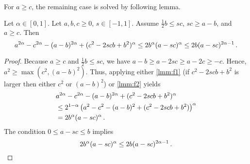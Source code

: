 %
For $a\geq c$, the remaining case is solved by following lemma.
%
\begin{lemma}\label{lmm:rascgeqacandageqc}
	Let $\alpha\in[0,1]$.
	Let $a,b,c\geq0$, $s\in[-1,1]$.
	Assume $\frac12 b \leq sc$, $sc \geq a-b$, and $a\geq c$.
	Then
	\begin{equation*}
		a^{2\alpha}-c^{2\alpha}-(a-b)^{2\alpha}+(c^2 - 2 s c b + b^2)^\alpha 
		\leq 
		2 b^\alpha (a-sc)^{\alpha}
		\leq 
		2 b (a-sc)^{2\alpha-1}
		\, .
	\end{equation*}
\end{lemma}
%
\begin{proof}
	Because $a \geq c$ and $\frac12 b \leq sc$, we have $a-b \geq a-2sc \geq a-2c \geq -c$. Hence, $a^2 \geq \max(c^2, (a-b)^2)$.
	Thus, applying either \autoref{lmm:f1} (if $c^2 - 2 s c b + b^2$ is larger then either $c^2$ or $(a-b)^2$) or \autoref{lmm:f2} yields
	\begin{align*}
		&a^{2\alpha}-c^{2\alpha}-(a-b)^{2\alpha}+(c^2 - 2 s c b + b^2)^\alpha 
		\\&\leq 
		2^{1-\alpha}
		\left( a^{2}-c^{2}-(a-b)^{2}+(c^2 - 2 s c b + b^2) \right)^\alpha 
		\\&=
		2 b^\alpha (a-sc)^{\alpha}
		\, .
	\end{align*}
	The condition $0 \leq a-sc \leq b$ implies
	\begin{equation*}
		2 b^\alpha (a-sc)^{\alpha}
		\leq 
		2 b (a-sc)^{2\alpha-1}
		\, .
	\end{equation*}
\end{proof}
%
%
%
